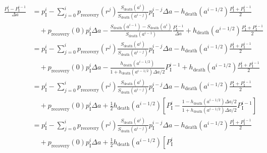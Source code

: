 \documentclass[12pt]{article}
\begin{document}
\begin{equation}
  \begin{split}
    \frac{P_{\mathrm{I}}^i - P_{\mathrm{I}}^{i - 1}}{\Delta a}
    &= p_{\mathrm{I}}^i
    - \sum_{j = 0}^i p_{\text{recovery}}(r^j)
    \frac{S_{\text{death}}(a^i)}{S_{\text{death}}(a^{i - j})}
    p_{\mathrm{I}}^{i - j} \Delta a
    - h_{\text{death}}(a^{i - 1 / 2})
    \frac{P_{\mathrm{I}}^i + P_{\mathrm{I}}^{i - 1}}{2}
    \\ & \quad {}
    + p_{\text{recovery}}(0) p_{\mathrm{I}}^i \Delta a
    - \frac{S_{\text{death}}(a^{i - 1}) - S_{\text{death}}(a^i)}
    {S_{\text{death}}(a^{i - 1})}
    \frac{P_{\mathrm{I}}^{i - 1}}{\Delta a}
    + h_{\text{death}}(a^{i - 1 / 2})
    \frac{P_{\mathrm{I}}^i + P_{\mathrm{I}}^{i - 1}}{2}
    \\
    &= p_{\mathrm{I}}^i
    - \sum_{j = 0}^i p_{\text{recovery}}(r^j)
    \frac{S_{\text{death}}(a^i)}{S_{\text{death}}(a^{i - j})}
    p_{\mathrm{I}}^{i - j} \Delta a
    - h_{\text{death}}(a^{i - 1 / 2})
    \frac{P_{\mathrm{I}}^i + P_{\mathrm{I}}^{i - 1}}{2}
    \\ & \quad {}
    + p_{\text{recovery}}(0) p_{\mathrm{I}}^i \Delta a
    - \frac{h_{\text{death}}(a^{i - 1 / 2})}
    {1 + h_{\text{death}}(a^{i - 1 / 2}) \Delta a / 2}
    P_{\mathrm{I}}^{i - 1}
    + h_{\text{death}}(a^{i - 1 / 2})
    \frac{P_{\mathrm{I}}^i + P_{\mathrm{I}}^{i - 1}}{2}
    \\
    &= p_{\mathrm{I}}^i
    - \sum_{j = 0}^i p_{\text{recovery}}(r^j)
    \frac{S_{\text{death}}(a^i)}{S_{\text{death}}(a^{i - j})}
    p_{\mathrm{I}}^{i - j} \Delta a
    - h_{\text{death}}(a^{i - 1 / 2})
    \frac{P_{\mathrm{I}}^i + P_{\mathrm{I}}^{i - 1}}{2}
    \\ & \quad {}
    + p_{\text{recovery}}(0) p_{\mathrm{I}}^i \Delta a
    + \frac{1}{2} h_{\text{death}}(a^{i - 1 / 2})
    \left[
      P_{\mathrm{I}}^i
      - \frac{1 - h_{\text{death}}(a^{i - 1 / 2}) \Delta a / 2}
      {1 + h_{\text{death}}(a^{i - 1 / 2}) \Delta a / 2}
      P_{\mathrm{I}}^{i - 1}
    \right]
    \\
    &= p_{\mathrm{I}}^i
    - \sum_{j = 0}^i p_{\text{recovery}}(r^j)
    \frac{S_{\text{death}}(a^i)}{S_{\text{death}}(a^{i - j})}
    p_{\mathrm{I}}^{i - j} \Delta a
    - h_{\text{death}}(a^{i - 1 / 2})
    \frac{P_{\mathrm{I}}^i + P_{\mathrm{I}}^{i - 1}}{2}
    \\ & \quad {}
    + p_{\text{recovery}}(0) p_{\mathrm{I}}^i \Delta a
    + \frac{1}{2} h_{\text{death}}(a^{i - 1 / 2})
    \left[
      P_{\mathrm{I}}^i

\end{split}
\end{equation}
\end{document}
